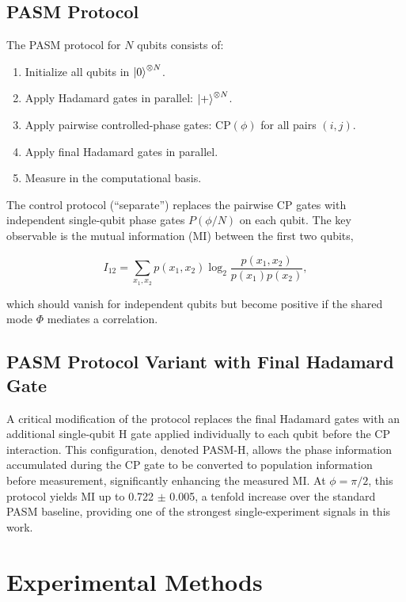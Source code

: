 \documentclass[12pt,a4paper]{article}
\begin{document}
\subsection{PASM Protocol}

The PASM protocol for $N$ qubits consists of:

\begin{enumerate}
    \item Initialize all qubits in $\ket{0}^{\otimes N}$.
    \item Apply Hadamard gates in parallel: $\ket{+}^{\otimes N}$.
    \item Apply pairwise controlled-phase gates: $\text{CP}(\phi)$ for all pairs $(i,j)$.
    \item Apply final Hadamard gates in parallel.
    \item Measure in the computational basis.
\end{enumerate}

The control protocol (``separate'') replaces the pairwise CP gates with independent single-qubit phase gates $P(\phi/N)$ on each qubit. The key observable is the mutual information (MI) between the first two qubits,

\begin{equation}
I_{12} = \sum_{x_1,x_2} p(x_1,x_2) \log_2 \frac{p(x_1,x_2)}{p(x_1)p(x_2)},
\end{equation}

which should vanish for independent qubits but become positive if the shared mode $\Phi$ mediates a correlation.

\subsection{PASM Protocol Variant with Final Hadamard Gate}

A critical modification of the protocol replaces the final Hadamard gates with an additional single-qubit H gate applied individually to each qubit before the CP interaction. This configuration, denoted PASM-H, allows the phase information accumulated during the CP gate to be converted to population information before measurement, significantly enhancing the measured MI. At $\phi = \pi/2$, this protocol yields MI up to 0.722 $\pm$ 0.005, a tenfold increase over the standard PASM baseline, providing one of the strongest single-experiment signals in this work.

\section{Experimental Methods}
\label{sec:methods}
\end{document}
